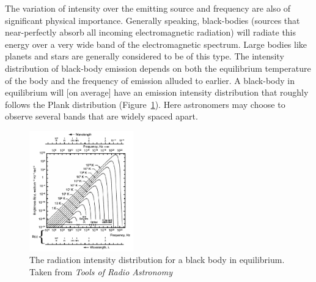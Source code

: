 \documentclass[a4paper,10pt]{report}
\begin{document}
The variation of intensity over the emitting source and frequency are also of significant physical importance. Generally speaking, black-bodies (sources that near-perfectly absorb all incoming electromagnetic radiation)
will radiate this energy over a very wide band of the electromagnetic spectrum. Large bodies like planets and stars are generally considered to be of 
this type. The intensity distribution of black-body emission depends on both the equilibrium temperature of the body and the frequency of emission alluded 
to earlier. A black-body in equilibrium will [on average] have an emission intensity distribution that roughly follows the Plank 
distribution (Figure~\ref{fig_plank}). Here astronomers may choose to observe several bands that are widely spaced apart.

\begin{figure}[ht]
 \begin{mdframed}
 \centering
 \includegraphics[width=0.4\textwidth]{images/plank_dist.png}
 \caption[Plank distribution]{The radiation intensity distribution for a black body in equilibrium. Taken from \textit{Tools of Radio Astronomy} \cite{wilson2009tools}}
  \label{fig_plank}
 \end{mdframed}
\end{figure}
\end{document}
